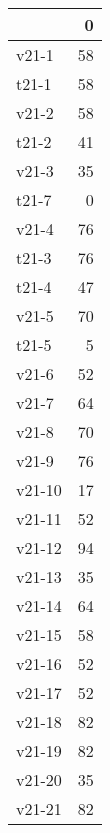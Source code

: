 \begin{tabular}{lr}
\toprule
{} &   0 \\
\midrule
v21-1  &  58 \\
t21-1  &  58 \\
v21-2  &  58 \\
t21-2  &  41 \\
v21-3  &  35 \\
t21-7  &   0 \\
v21-4  &  76 \\
t21-3  &  76 \\
t21-4  &  47 \\
v21-5  &  70 \\
t21-5  &   5 \\
v21-6  &  52 \\
v21-7  &  64 \\
v21-8  &  70 \\
v21-9  &  76 \\
v21-10 &  17 \\
v21-11 &  52 \\
v21-12 &  94 \\
v21-13 &  35 \\
v21-14 &  64 \\
v21-15 &  58 \\
v21-16 &  52 \\
v21-17 &  52 \\
v21-18 &  82 \\
v21-19 &  82 \\
v21-20 &  35 \\
v21-21 &  82 \\
\bottomrule
\end{tabular}

